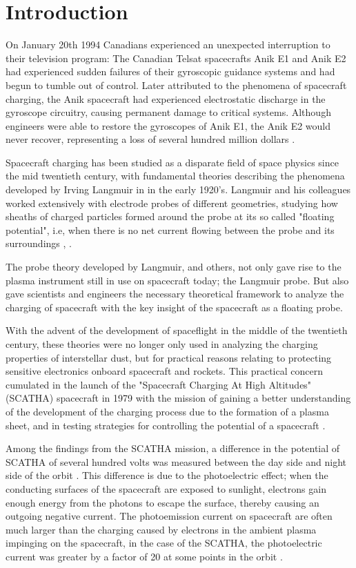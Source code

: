 \chapter{Introduction}
\label{sec:intro}

On January 20th 1994 Canadians experienced an unexpected interruption to their television program: The Canadian Telsat spacecrafts Anik E1 and Anik E2 had experienced sudden failures of their gyroscopic guidance systems and had begun to tumble out of control. Later attributed to the phenomena of spacecraft charging, the Anik spacecraft had experienced electrostatic discharge in the gyroscope circuitry, causing permanent damage to critical systems. Although engineers were able to restore the gyroscopes of Anik E1, the Anik E2 would never recover, representing a loss of several hundred million dollars \parencite{Leach1995}.

Spacecraft charging has been studied as a disparate field of space physics since the mid twentieth century, with fundamental theories describing the phenomena developed by Irving Langmuir in in the early 1920's. Langmuir and his colleagues worked extensively with electrode probes of different geometries, studying how sheaths of charged particles formed around the probe at its so called "floating potential", i.e, when there is no net current flowing between the probe and its surroundings \parencite{Mott-Smith1926}, \parencite{Garrett1981}. 

The probe theory developed by Langmuir, and others, not only gave rise to the plasma instrument still in use on spacecraft today; the Langmuir probe. But also gave scientists and engineers the necessary theoretical framework to analyze the charging of spacecraft with the key insight of the spacecraft as a floating probe. 

With the advent of the development of spaceflight in the middle of the twentieth century, these theories were no longer only used in analyzing the charging properties of interstellar dust, but for practical reasons relating to protecting sensitive electronics onboard spacecraft and rockets. This practical concern cumulated in the launch of the "Spacecraft Charging At High Altitudes" (SCATHA) spacecraft in 1979 with the mission of gaining a better understanding of the development of the charging process due to the formation of a plasma sheet, and in testing strategies for controlling the potential of a spacecraft \parencite{SCATHA2020}. 

Among the findings from the SCATHA mission, a difference in the potential of SCATHA of several hundred volts was measured between the day side and night side of the orbit \parencite{Mullen1986}. This difference is due to the photoelectric effect; when the conducting surfaces of the spacecraft are exposed to sunlight, electrons gain enough energy from the photons to escape the surface, thereby causing an outgoing negative current. The photoemission current on spacecraft are often much larger than the charging caused by electrons in the ambient plasma impinging on the spacecraft, in the case of the SCATHA, the photoelectric current was greater by a factor of 20 at some points in the orbit \parencite{LAI2019}.  

